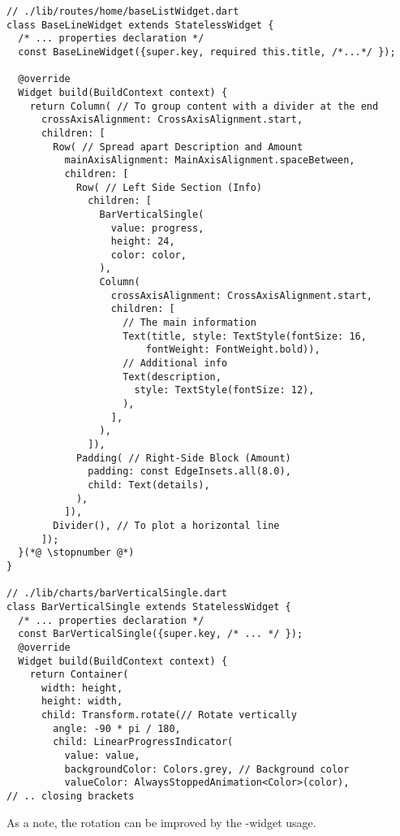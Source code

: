 \begin{lstlisting}
// ./lib/routes/home/baseListWidget.dart
class BaseLineWidget extends StatelessWidget {
  /* ... properties declaration */
  const BaseLineWidget({super.key, required this.title, /*...*/ });

  @override
  Widget build(BuildContext context) {
    return Column( // To group content with a divider at the end
      crossAxisAlignment: CrossAxisAlignment.start,
      children: [
        Row( // Spread apart Description and Amount
          mainAxisAlignment: MainAxisAlignment.spaceBetween,
          children: [
            Row( // Left Side Section (Info)
              children: [
                BarVerticalSingle(
                  value: progress, 
                  height: 24, 
                  color: color,
                ),
                Column(
                  crossAxisAlignment: CrossAxisAlignment.start,
                  children: [
                    // The main information
                    Text(title, style: TextStyle(fontSize: 16, 
                        fontWeight: FontWeight.bold)),
                    // Additional info
                    Text(description,
                      style: TextStyle(fontSize: 12),
                    ),
                  ],
                ),
              ]),
            Padding( // Right-Side Block (Amount)
              padding: const EdgeInsets.all(8.0),
              child: Text(details),
            ),
          ]),
        Divider(), // To plot a horizontal line
      ]);
  }(*@ \stopnumber @*)
}

// ./lib/charts/barVerticalSingle.dart
class BarVerticalSingle extends StatelessWidget {
  /* ... properties declaration */
  const BarVerticalSingle({super.key, /* ... */ });
  @override
  Widget build(BuildContext context) {
    return Container(
      width: height,
      height: width,
      child: Transform.rotate(// Rotate vertically
        angle: -90 * pi / 180,
        child: LinearProgressIndicator(
          value: value,
          backgroundColor: Colors.grey, // Background color
          valueColor: AlwaysStoppedAnimation<Color>(color),
// .. closing brackets
\end{lstlisting}

\noindent As a note, the rotation can be improved by the -widget usage.


